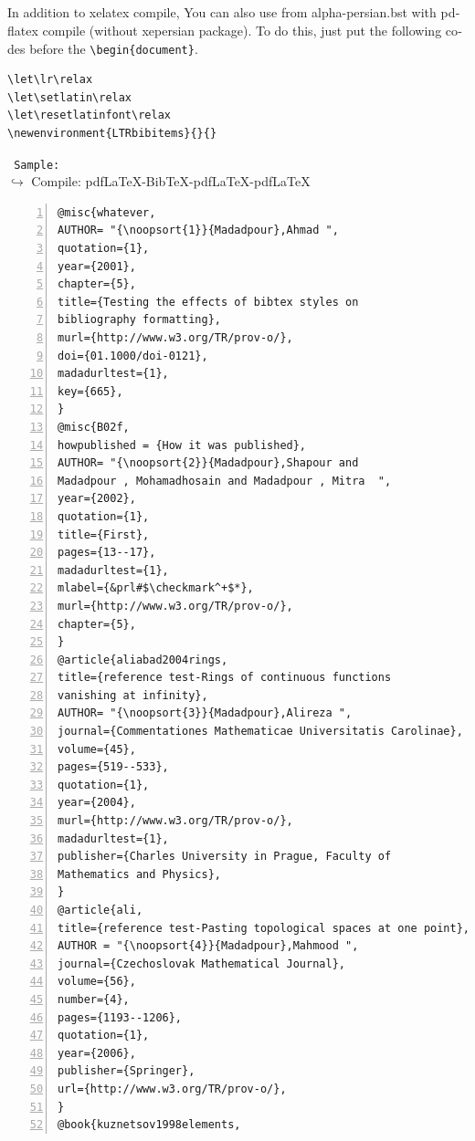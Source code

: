 \documentclass{article}
\newcommand{\pdflatex}{P\!\!\reflectbox{\raisebox{-1mm}{{\small D}}}F\LaTeX}
\begin{document}
\nocite{*}                  

%
%
%
%
%
%
%

\newpage
\begin{latin}
\section{\lr{alpha-persian.bst with \protect \pdflatex}}
In addition to xelatex compile,
You can also use from alpha-persian.bst with pdflatex compile (without xepersian package).
To do this, just put the following codes before the  \verb|\begin{document}|.
\begin{verbatim}
\let\lr\relax
\let\setlatin\relax
\let\resetlatinfont\relax
\newenvironment{LTRbibitems}{}{}
\end{verbatim}
{\tt\color{blue} Sample:}\\
{\color{blue}$\hookrightarrow$ Compile: pdfLaTeX-BibTeX-pdfLaTeX-pdfLaTeX}
\begin{Verbatim}[numbers=left,fontsize=\bf,commandchars=\&\#\*,baselinestretch=1,firstnumber=1,formatcom=\color{green!50!black}]
@misc{whatever,
AUTHOR= "{\noopsort{1}}{Madadpour},Ahmad ",
quotation={1},
year={2001},
chapter={5},
title={Testing the effects of bibtex styles on
bibliography formatting},
murl={http://www.w3.org/TR/prov-o/},
doi={01.1000/doi-0121},
madadurltest={1},
key={665},
}
@misc{B02f,
howpublished = {How it was published},
AUTHOR= "{\noopsort{2}}{Madadpour},Shapour and
Madadpour , Mohamadhosain and Madadpour , Mitra  ",
year={2002},
quotation={1},
title={First},
pages={13--17},
madadurltest={1},
mlabel={&prl#$\checkmark^+$*},
murl={http://www.w3.org/TR/prov-o/},
chapter={5},
}
@article{aliabad2004rings,
title={reference test-Rings of continuous functions
vanishing at infinity},
AUTHOR= "{\noopsort{3}}{Madadpour},Alireza ",
journal={Commentationes Mathematicae Universitatis Carolinae},
volume={45},
pages={519--533},
quotation={1},
year={2004},
murl={http://www.w3.org/TR/prov-o/},
madadurltest={1},
publisher={Charles University in Prague, Faculty of
Mathematics and Physics},
}
@article{ali,
title={reference test-Pasting topological spaces at one point},
AUTHOR = "{\noopsort{4}}{Madadpour},Mahmood ",
journal={Czechoslovak Mathematical Journal},
volume={56},
number={4},
pages={1193--1206},
quotation={1},
year={2006},
publisher={Springer},
url={http://www.w3.org/TR/prov-o/},
}
@book{kuznetsov1998elements,

\end{Verbatim}
\end{latin}
\end{document}
